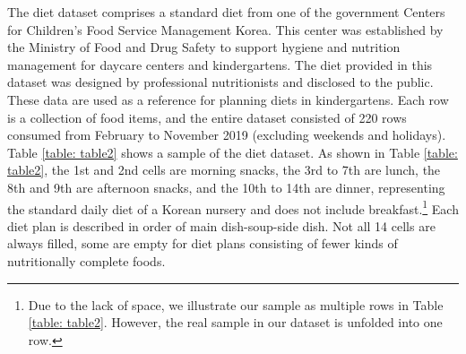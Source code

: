 \documentclass{article}
\begin{document}
The diet dataset comprises a standard diet from one of the government Centers for Children’s Food Service Management Korea. This center was established by the Ministry of Food and Drug Safety to support hygiene and nutrition management for daycare centers and kindergartens. The diet provided in this dataset was designed by professional nutritionists and disclosed to the public. These data are used as a reference for planning diets in kindergartens. Each row is a collection of food items, and the entire dataset consisted of 220 rows consumed from February to November 2019 (excluding weekends and holidays). Table \ref{table: table2} shows a sample of the diet dataset. As shown in Table \ref{table: table2}, the 1st and 2nd cells are morning snacks, the 3rd to 7th are lunch, the 8th and 9th are afternoon snacks, and the 10th to 14th are dinner, representing the standard daily diet of a Korean nursery and does not include breakfast.\footnote{Due to the lack of space, we illustrate our sample as multiple rows in Table \ref{table: table2}. However, the real sample in our dataset is unfolded into one row.} Each diet plan is described in order of main dish-soup-side dish. Not all 14 cells are always filled, some are empty for diet plans consisting of fewer kinds of nutritionally complete foods.
\end{document}
